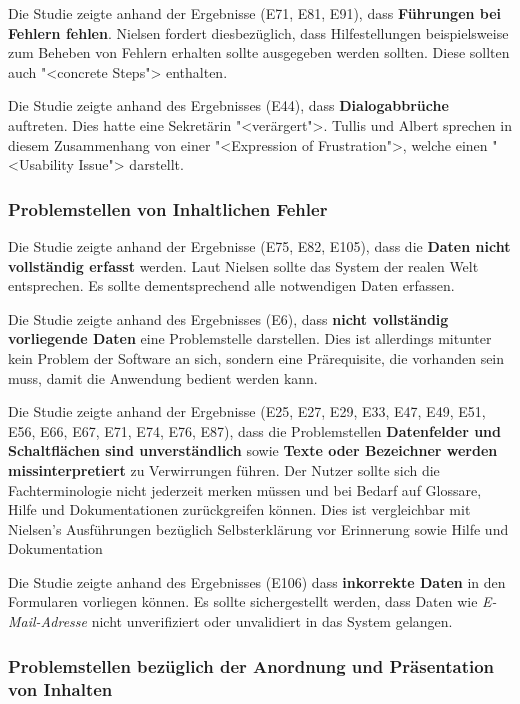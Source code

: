 Die Studie zeigte anhand der Ergebnisse (E71, E81, E91), dass \textbf{Führungen bei Fehlern fehlen}. Nielsen fordert diesbezüglich, dass Hilfestellungen beispielsweise zum Beheben von Fehlern erhalten sollte ausgegeben werden sollten. Diese sollten auch "<concrete Steps"> enthalten. \cite{Nielsen10}

Die Studie zeigte anhand des Ergebnisses (E44), dass \textbf{Dialogabbrüche} auftreten. Dies hatte eine Sekretärin "<verärgert">. Tullis und Albert sprechen in diesem Zusammenhang von einer "<Expression of Frustration">, welche einen "<Usability Issue"> darstellt.\cite{TullisAlbert}

\subsubsection{Problemstellen von Inhaltlichen Fehler}
Die Studie zeigte anhand der Ergebnisse (E75, E82, E105), dass die \textbf{Daten nicht vollständig erfasst} werden. Laut Nielsen sollte das System der realen Welt entsprechen.\cite{Nielsen10} Es sollte dementsprechend alle notwendigen Daten erfassen.

Die Studie zeigte anhand des Ergebnisses (E6), dass \textbf{nicht vollständig vorliegende Daten} eine Problemstelle darstellen. Dies ist allerdings mitunter kein Problem der Software an sich, sondern eine Prärequisite, die vorhanden sein muss, damit die Anwendung bedient werden kann.

Die Studie zeigte anhand der Ergebnisse (E25, E27, E29, E33, E47, E49, E51, E56, E66, E67, E71, E74, E76, E87), dass die Problemstellen \textbf{Datenfelder und Schaltflächen sind unverständlich} sowie \textbf{Texte oder Bezeichner werden missinterpretiert} zu Verwirrungen führen. Der Nutzer sollte sich die Fachterminologie nicht jederzeit merken müssen und bei Bedarf auf Glossare, Hilfe und Dokumentationen zurückgreifen können. Dies ist vergleichbar mit Nielsen's Ausführungen bezüglich \glqq Selbsterklärung vor Erinnerung\grqq{} sowie \glqq Hilfe und Dokumentation\grqq{} \cite{Nielsen10}

Die Studie zeigte anhand des Ergebnisses (E106) dass \textbf{inkorrekte Daten} in den Formularen vorliegen können. Es sollte sichergestellt werden, dass Daten wie \textit{E-Mail-Adresse} nicht unverifiziert oder unvalidiert in das System gelangen.

\subsubsection{Problemstellen bezüglich der Anordnung und Präsentation von Inhalten}

